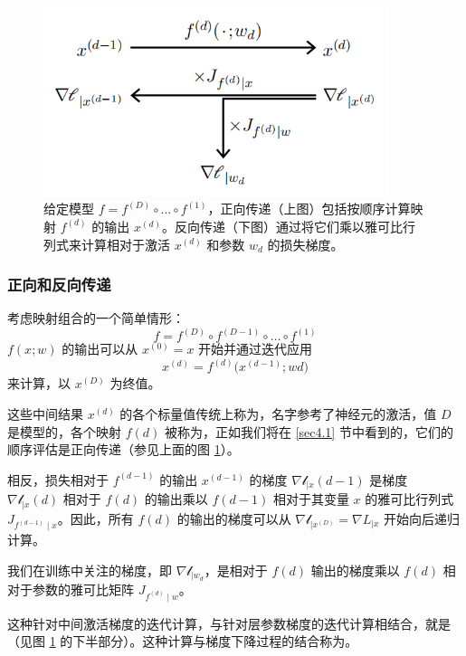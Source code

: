\begin{figure}
    \centering
    \includegraphics[width=0.9\textwidth]{fig/fig3.3.png}
    \caption[反向传播]{给定模型 $f = f^{(D)} \circ \dots \circ f^{(1)}$，正向传递（上图）包括按顺序计算映射 $f^{(d)}$ 的输出 $x^{(d)}$。反向传递（下图）通过将它们乘以雅可比行列式来计算相对于激活 $x^{(d)}$ 和参数 $w_d$ 的损失梯度。}
    \label{fig3.3}
\end{figure}

\subsubsection*{正向和反向传递}

考虑映射组合的一个简单情形：
\[f = f^{(D)} \circ f^{(D-1)} \circ \dots \circ f^{(1)}\]
$f(x;w)$ 的输出可以从 $x^{(0)} = x$ 开始并通过迭代应用
\[x^{(d)} = f^{(d)}\Big(x^{(d-1)};wd\Big)\]
来计算，以 $x^{(D)}$ 为终值。

这些中间结果 $x^{(d)}$ 的各个标量值传统上称为，名字参考了神经元的激活，值 $D$ 是模型的，各个映射 $f(d)$ 被称为，正如我们将在 \ref{sec4.1} 节中看到的，它们的顺序评估是正向传递（参见上面的图 \ref{fig3.3}）。

相反，损失相对于 $f^{(d-1)}$ 的输出 $x^(d-1)$ 的梯度 $\nabla \mathcal{l}_{\mid x}(d-1)$ 是梯度 $\nabla \mathcal{l}_{\mid x}(d)$ 相对于 $f(d)$ 的输出乘以 $f(d-1)$ 相对于其变量 $x$ 的雅可比行列式 $J_{f^{(d-1)} \mid x}$。因此，所有 $f(d)$ 的输出的梯度可以从 $\nabla \mathcal{l}_{\mid x^{(D)}} = \nabla L_{\mid x}$ 开始向后递归计算。

我们在训练中关注的梯度，即 $\nabla \mathcal{l}_{\mid w_d}$，是相对于 $f(d)$ 输出的梯度乘以 $f(d)$ 相对于参数的雅可比矩阵 $J_{f^{(d)} \mid w}$。

这种针对中间激活梯度的迭代计算，与针对层参数梯度的迭代计算相结合，就是（见图 \ref{fig3.3} 的下半部分）。这种计算与梯度下降过程的结合称为。

